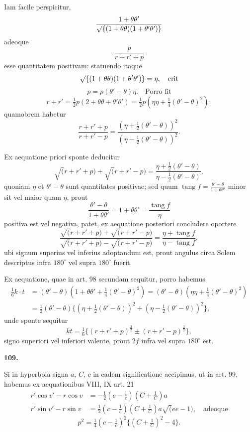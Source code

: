 \documentclass[12pt,a4paper]{article}
\newcommand{\ee}{e}
\DeclareMathOperator{\tang}{tang}
\begin{document}
Iam facile perspicitur,
\[
\frac{1 + \theta\theta'}{\surd\{(1+\theta\theta)(1+\theta'\theta')\}}
\]
adeoque
\[
\frac{p}{r + r' + p}
\]
esse quantitatem positivam: statuendo itaque
\[
\surd\{(1+\theta\theta)(1+\theta'\theta')\} = \eta, \quad \text{erit}
\]
\[
p = p(\theta' - \theta)\eta. \quad \text{Porro fit}
\]
\[
r + r' = \tfrac{1}{2}p(2 + \theta\theta + \theta'\theta') = \tfrac{1}{2}p(\eta\eta + \tfrac{1}{4}(\theta' - \theta)^2):
\]
quamobrem habetur
\[
\frac{r + r' + p}{r + r' - p} = \frac{(\eta + \tfrac{1}{2}(\theta' - \theta))^2}{(\eta - \tfrac{1}{2}(\theta' - \theta))^2}.
\]

Ex aequatione priori sponte deducitur
\[
\surd(r + r' + p) + \surd(r + r' - p) = \frac{\eta + \tfrac{1}{2}(\theta' - \theta)}{\eta - \tfrac{1}{2}(\theta' - \theta)},
\]
quoniam $\eta$ et $\theta' - \theta$ sunt quantitates positivae; sed quum
$\tang f = \frac{\theta' - \theta}{1 + \theta\theta'}$ minor sit
vel maior quam $\eta$, prout
\[
\frac{\theta' - \theta}{1 + \theta\theta'} = 1 + \theta\theta' = \frac{\tang f}{\eta}
\]
positiva est vel negativa, patet, ex aequatione posteriori concludere oportere
\[
\frac{\surd(r + r' + p) + \surd(r + r' - p)}{\surd(r + r' + p) - \surd(r + r' - p)} = \frac{\eta + \tang f}{\eta - \tang f},
\]
ubi signum superius vel inferius adoptandum est, prout angulus circa Solem
descriptus infra $180^\circ$ vel supra $180^\circ$ fuerit.

Ex aequatione, quae in art. 98 secundam sequitur, porro habemus
\begin{align*}
\tfrac{1}{6}k\cdot t &= (\theta' - \theta)(1 + \theta\theta' + \tfrac{1}{4}(\theta' - \theta)^2) = (\theta' - \theta)(\eta\eta + \tfrac{1}{4}(\theta' - \theta)^2) \\
&= \tfrac{1}{2}(\theta' - \theta)\{(\eta + \tfrac{1}{2}(\theta' - \theta))^2 + (\eta - \tfrac{1}{2}(\theta' - \theta))^2\},
\end{align*}
unde sponte sequitur
\[
kt = \tfrac{1}{6}\{(r + r' + p)^{\frac{3}{2}} \pm (r + r' - p)^{\frac{3}{2}}\},
\]
signo superiori vel inferiori valente, prout $2f$ infra vel supra $180^\circ$ est.

\bigskip
\noindent\textbf{109.}

Si in hyperbola signa $a$, $C$, $c$ in eadem significatione accipimus, ut in
art. 99, habemus ex aequationibus VIII, IX art. 21
\begin{align*}
r'\cos v' - r\cos v &= -\tfrac{1}{2}(c - \tfrac{1}{c})(C + \tfrac{1}{C})a \\
r'\sin v' - r\sin v &= \tfrac{1}{2}(c - \tfrac{1}{c})(C + \tfrac{1}{C})a\surd(\ee\ee - 1), \quad \text{adeoque}
\end{align*}
\[
p^2 = \tfrac{1}{4}(c - \tfrac{1}{c})^2\{(C + \tfrac{1}{C})^2 - 4\}.
\]
\end{document}
